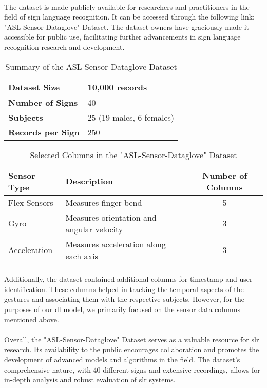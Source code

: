 \paragraph{}
The dataset is made publicly available for researchers and practitioners in the field of sign language recognition. It can be accessed through the following link: "ASL-Sensor-Dataglove" Dataset. The dataset owners have graciously made it accessible for public use, facilitating further advancements in sign language recognition research and development.
\begin{table}
	\centering
	\caption{Summary of the ASL-Sensor-Dataglove Dataset}
	\label{tab:dataset-summary}
	\begin{tabular}{|l|l|}
		\hline
		\textbf{Dataset Size} & 10,000 records \\
		\hline
		\textbf{Number of Signs} & 40 \\
		\hline
		\textbf{Subjects} & 25 (19 males, 6 females) \\
		\hline
		\textbf{Records per Sign} & 250 \\
		\hline
	\end{tabular}
\end{table}
\begin{table}
	\centering
	\caption{Selected Columns in the "ASL-Sensor-Dataglove" Dataset}
	\label{tab:column-used}
	\begin{tabular}{|l|l|c|}
		\hline
		\textbf{Sensor Type} & \textbf{Description} & \textbf{Number of Columns} \\
		\hline
		Flex Sensors & Measures finger bend & 5 \\
		\hline
		Gyro & Measures orientation and angular velocity & 3 \\
		\hline
		Acceleration & Measures acceleration along each axis & 3 \\
		\hline
	\end{tabular}
\end{table}
\paragraph{}
Additionally, the dataset contained additional columns for timestamp and user identification. These columns helped in tracking the temporal aspects of the gestures and associating them with the respective subjects. However, for the purposes of our \ac{dl} model, we primarily focused on the sensor data columns mentioned above.
\paragraph{}
Overall, the "ASL-Sensor-Dataglove" Dataset serves as a valuable resource for \ac{slr} research. Its availability to the public encourages collaboration and promotes the development of advanced models and algorithms in the field. The dataset's comprehensive nature, with 40 different signs and extensive recordings, allows for in-depth analysis and robust evaluation of \ac{slr} systems.